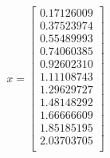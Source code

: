 \documentclass[11pt]{extarticle}
\begin{document}
	\begin{figure}[H]
		\begin{align}
			x = \begin{bmatrix}
				0.17126009 \\
				0.37523974 \\
				0.55489993 \\
				0.74060385 \\
				0.92602310 \\
				1.11108743 \\
				1.29629727 \\
				1.48148292 \\
				1.66666609 \\
				1.85185195 \\
				2.03703705 \\

\end{bmatrix}
\end{align}
\end{figure}
\end{document}
